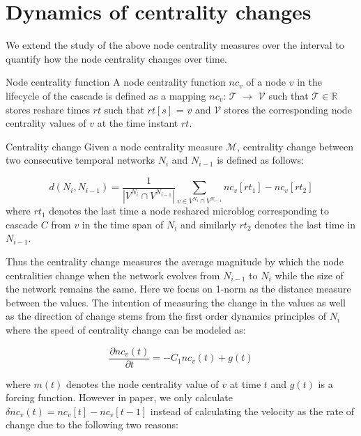 \documentclass[smallextended]{svjour3}       %
\theoremstyle{definition}
\begin{document}
\section{Dynamics of centrality changes}\label{sec:cent_change}
We extend the study of the above node centrality measures over the interval to quantify how the node centrality changes over time. 

\begin{definition}{Node centrality function}
A node centrality function $nc_v$ of a node $v$ in the lifecycle of the cascade is defined as a 
mapping $nc_v$: $\mathcal{T}$ $\rightarrow$ $\mathcal{V} $ such that $\mathcal{T} \in \mathbb{R}$ stores reshare times $rt$ such that $rt[s]$ = $v$ and $\mathcal{V}$ stores the corresponding node centrality values of $v$ at the time instant $rt$.  
\end{definition}

\begin{definition}{Centrality change}
Given a node centrality measure $\mathcal{M}$, centrality change between two consecutive temporal networks $N_i$ and $ N_{i-1}$ is defined as follows:

\begin{equation*}
d(N_i, N_{i-1}) = \frac{1}{|V^{N_i} \cap V^{N_{i-1}}|} \sum_{v \in V^{N_i} \cap V^{N_{i-1}}}  nc_v[rt_1] - nc_v[rt_2]
\end{equation*}
where $rt_1$ denotes the last time a node reshared microblog corresponding to cascade $C$ from $v$ in the time span of $N_i$ and similarly $rt_2$ denotes the last time in $N_{i-1}$. 

\end{definition}

Thus the centrality change measures the average magnitude by which the node centralities change when the network evolves from $N_{i-1} $ to $N_i$ while the size of the network remains the same. Here we focus on 1-norm as the distance measure between the values. The intention of measuring the change in the values as well as the direction of change stems from the first order dynamics principles of $N_i$ where the speed of centrality change can be modeled as:

\begin{equation}
\frac{\partial nc_v(t)}{\partial t} = -C_1 nc_v(t) + g(t) 
\end{equation}

where $m(t)$ denotes the node centrality value of $v$ at time $t$ and $g(t)$ is a forcing function. However in paper, we only calculate $\delta nc_v(t) = nc_v[t] - nc_v[t-1]$ instead of calculating the velocity as the rate of change due to the following two reasons:
\end{document}
